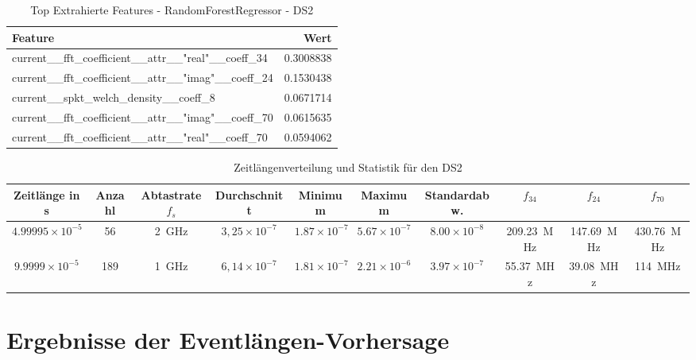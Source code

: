 \begin{table}[h!]
\centering
\caption{Top Extrahierte Features - RandomForestRegressor - DS2}
\label{tab:ds2-features}
\begin{tabular}{l r}
\hline
\textbf{Feature} & \textbf{Wert} \\
\hline
current\_\_fft\_coefficient\_\_attr\_\_"real"\_\_coeff\_34 & 0.3008838 \\
current\_\_fft\_coefficient\_\_attr\_\_"imag"\_\_coeff\_24 & 0.1530438 \\
current\_\_spkt\_welch\_density\_\_coeff\_8 & 0.0671714 \\
current\_\_fft\_coefficient\_\_attr\_\_"imag"\_\_coeff\_70 & 0.0615635 \\
current\_\_fft\_coefficient\_\_attr\_\_"real"\_\_coeff\_70 & 0.0594062 \\
\hline
\end{tabular}
\end{table}


\begin{table}[h!]
\centering
\begin{tabular}{|c|c|c|c|c|c|c|c|c|c|}
\hline
\textbf{Zeitlänge in s} & \textbf{Anzahl} & \textbf{Abtastrate} $f_s$ & \textbf{Durchschnitt} & \textbf{Minimum} & \textbf{Maximum} & \textbf{Standardabw.} & \(f_{34}\) & \(f_{24}\) & \(f_{70}\)\\
\hline
$4.99995 \times 10^{-5}$ & 56  & \SI{2}{\giga\hertz} & $3,25 \times 10^{-7}$ & $1.87 \times 10^{-7}$ & $5.67 \times 10^{-7}$ & $8.00 \times 10^{-8}$ & \SI{209,23}{\mega\hertz} & \SI{147,69}{\mega\hertz} & \SI{430,76}{\mega\hertz}\\
$9.9999 \times 10^{-5}$  & 189 & \SI{1}{\giga\hertz} & $6,14 \times 10^{-7}$ & $1.81 \times 10^{-7}$ & $2.21 \times 10^{-6}$ & $3.97 \times 10^{-7}$ & \SI{55,37}{\mega\hertz} & \SI{39,08}{\mega\hertz} & \SI{114}{\mega\hertz}\\
\hline
\end{tabular}
\caption{Zeitlängenverteilung und Statistik für den DS2}
\label{tab:ds2-sample}
\end{table}




\section{Ergebnisse der Eventlängen-Vorhersage}

